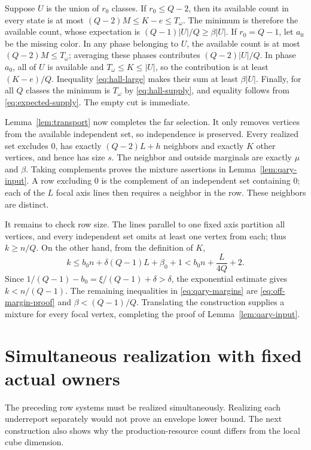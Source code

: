 Suppose $U$ is the union of $r_0$ classes.  If $r_0\le Q-2$, then its
available count in every state is at most $(Q-2)M\le K-e\le T_\omega$.
The minimum is therefore the available count, whose expectation is
$(Q-1)|U|/Q\ge\beta|U|$.
If $r_0=Q-1$, let $a_0$ be the missing color.  In any phase belonging
to $U$, the available count is at most $(Q-2)M\le T_\omega$; averaging
these phases contributes $(Q-2)|U|/Q$.  In phase $a_0$, all of $U$ is
available and $T_\omega\le K\le|U|$, so the contribution is at least
$(K-e)/Q$.  Inequality \eqref{eq:hall-large} makes their sum at least
$\beta|U|$.  Finally, for all $Q$ classes the minimum is $T_\omega$
by \eqref{eq:hall-supply}, and equality follows from
\eqref{eq:expected-supply}.  The empty cut is immediate.

Lemma~\ref{lem:transport} now completes the far selection.  It only
removes vertices from the available independent set, so independence
is preserved.  Every realized set excludes $0$, has exactly
$(Q-2)L+h$ neighbors and exactly $K$ other vertices, and hence has size
$s$.  The neighbor and outside marginals are exactly $\mu$ and $\beta$.
Taking complements proves the mixture assertions in
Lemma~\ref{lem:qary-input}.  A row excluding $0$ is the complement of an
independent set containing $0$; each of the $L$ focal axis lines then
requires a neighbor in the row.  These neighbors are distinct.

It remains to check row size.  The lines parallel to one fixed axis
partition all vertices, and every independent set omits at least one
vertex from each; thus $k\ge n/Q$.  On the other hand, from the definition
of $K$,
\[
 k\le b_0n+\delta(Q-1)L+\beta_0+1
       < b_0n+\frac L{4Q}+2.
\]
Since $1/(Q-1)-b_0=\xi/(Q-1)+\delta>\delta$, the exponential estimate
gives $k<n/(Q-1)$.  The remaining inequalities in
\eqref{eq:qary-margins} are \eqref{eq:off-margin-proof} and
$\beta<(Q-1)/Q$.  Translating the construction supplies a mixture for
every focal vertex, completing the proof of
Lemma~\ref{lem:qary-input}.

\section{Simultaneous realization with fixed actual owners}
\label{app:realization}

The preceding row systems must be realized simultaneously.  Realizing
each underreport separately would not prove an envelope lower bound.
The next construction also shows why the production-resource count
differs from the local cube dimension.

